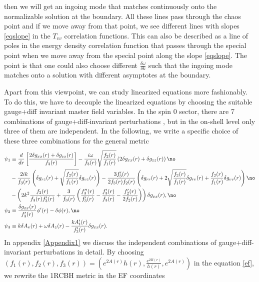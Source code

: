 \documentclass[preprintnumbers,aps,prd,longbibliography,nofootinbib,nobibnotes,amsmath,amssymb]{revtex4}
\begin{document}
then we will get an ingoing mode that matches continuously onto the normalizable solution at the boundary. All these lines pass through the chaos point and if we move away from that point, we see different lines with slopes \eqref{eqslope} in the $T_{v v}$ correlation functions. This can also be described as a line of poles in the energy density correlation function that passes through the special point when we move away from the special point along the slope \eqref{eqslope}. The point is that one could also choose  different $\frac{\delta \omega}{\delta k}$ such that the ingoing mode matches onto a solution with different asymptotes at the boundary. 

Apart from this viewpoint, we can study linearized equations  more fashionably. To do this, we have to decouple the linearized equations by choosing the suitable gauge+diff invariant master field variables. In the spin 0 sector, there are 7 combinations of gauge+diff-invariant perturbations \cite{Jansen:2019wag,Kodama:2003jz}, but in the on-shell level only three of them are independent. In the following, we write a specific choice of these three combinations for the general metric
\begin{align}\label{eq47}
	\psi_1 &\equiv \frac{d}{dr}\left[\frac{2\delta g_{x x}(r)  + \delta g_{z z}(r)}{f_3(r)}\right] - \frac{i \omega}{f_3(r)} \sqrt{\frac{f_2(r)}{f_1(r)}} \left(2\delta g_{x x}(r)  + \delta g_{z z}(r)\right)\no\\
	& - \frac{2 i k}{f_3(r)} \left(\delta g_{r z}(r) + \sqrt{\frac{f_2(r)}{f_1(r)}}\delta g_{v z}(r)\right) - \frac{3 f_3'(r)}{2 f_3(r) f_2(r)} \left(\delta g_{rr}(r) + 2 \sqrt{\frac{f_2(r)}{f_1(r)}}\delta g_{r v}(r) + \frac{f_2(r)}{f_1(r)} \delta g_{v v}(r)\right) \no\\
	& - \left(2 k^2\frac{f_2(r)}{f_3(r) f_3'(r)} + \frac{3}{ f_3(r)} \left(\frac{f_3''(r)}{f_3'(r)}  -  \frac{f_3'(r)}{f_3(r)} - \frac{f_2'(r)}{2 f_2(r)}\right)\right) \delta g_{x x}(r) ,\no\\
	\psi_2 & \equiv \frac{\delta g_{x x}(r)}{f_3'(r)} \phi'(r) - \delta \phi(r),\no\\
	\psi_3 &\equiv k \delta A_v(r) + \omega \delta A_z(r) - \frac{k A_t'(r)}{f_3'(r)} \delta g_{x x}(r).
\end{align}
In appendix \ref{Appendix1} we discuss the independent combinations of gauge+diff-invariant perturbations in detail. By choosing $(f_1(r), f_2(r), f_3(r)) = (e^{2 A(r)} h(r), \frac{e^{2 B(r)}}{h(r)}, e^{2 A(r)})$ in the equation \eqref{ef}, we rewrite  the 1RCBH metric  in the  EF coordinates  %
\end{document}

